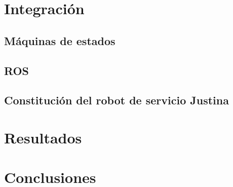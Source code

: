 \documentclass[a4paper, openright, 12pt]{report}
\begin{document}
\chapter{Integración}
	\section{Máquinas de estados}
	\section{ROS}
	\section{Constitución del robot de servicio Justina}


\chapter{Resultados}


\chapter{Conclusiones}


\newpage{}




\end{document}
